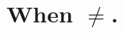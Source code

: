 \documentclass{scrreprt}
\begin{document}
\chapter{When \texorpdfstring{$\ne$}{not equal}.}
\end{document}
